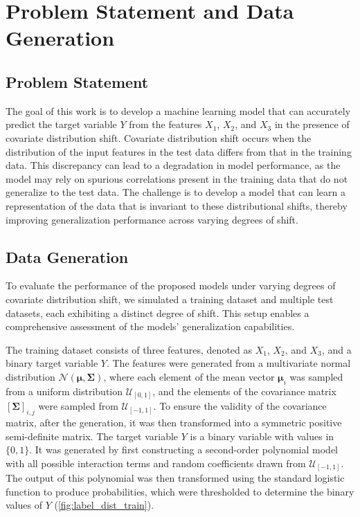 \chapter{Problem Statement and Data Generation}

\section{Problem Statement}
\label{sec:problem_statement}
The goal of this work is to develop a machine learning model that can accurately predict the target variable $Y$ from the features $X_1$, $X_2$, and $X_3$ in the presence of covariate distribution shift. Covariate distribution shift occurs when the distribution of the input features in the test data differs from that in the training data. This discrepancy can lead to a degradation in model performance, as the model may rely on spurious correlations present in the training data that do not generalize to the test data. The challenge is to develop a model that can learn a representation of the data that is invariant to these distributional shifts, thereby improving generalization performance across varying degrees of shift.

\section{Data Generation}

To evaluate the performance of the proposed models under varying degrees of covariate distribution shift, we simulated a training dataset and multiple test datasets, each exhibiting a distinct degree of shift. 
This setup enables a comprehensive assessment of the models' generalization capabilities.

The training dataset consists of three features, denoted as $X_1$, $X_2$, and $X_3$, and a binary target variable $Y$. The features were generated from a multivariate normal distribution $\mathcal{N}(\boldsymbol{\mu}, \boldsymbol{\Sigma})$, where each element of the mean vector $\boldsymbol{\mu}_i$ was sampled from a uniform distribution $\mathcal{U}_{[0, 1]}$, and the elements of the covariance matrix $[\boldsymbol{\Sigma}]_{i,j}$ were sampled from $\mathcal{U}_{[-1, 1]}$. To ensure the validity of the covariance matrix, after the generation, it was then transformed into a symmetric positive semi-definite matrix.
The target variable $Y$ is a binary variable with values in $\{0, 1\}$. It was generated by first constructing a second-order polynomial model with all possible interaction terms and random coefficients drawn from $\mathcal{U}_{[-1, 1]}$. The output of this polynomial was then transformed using the standard logistic function to produce probabilities, which were thresholded to determine the binary values of $Y$ (\cref{fig:label_dist_train}).


